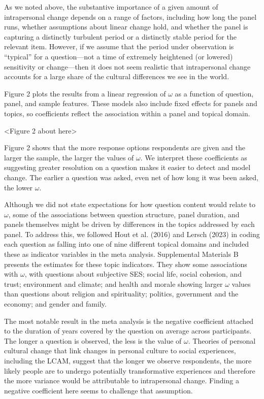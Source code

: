 \documentclass[
  11pt,
]{article}
\begin{document}
As we noted above, the substantive importance of a given amount of
intrapersonal change depends on a range of factors, including how long
the panel runs, whether assumptions about linear change hold, and
whether the panel is capturing a distinctly turbulent period or a
distinctly stable period for the relevant item. However, if we assume
that the period under observation is ``typical'' for a question---not a
time of extremely heightened (or lowered) sensitivity or change---then
it does not seem realistic that intrapersonal change accounts for a
large share of the cultural differences we see in the world.

Figure 2 plots the results from a linear regression of \(\omega\) as a
function of question, panel, and sample features. These models also
include fixed effects for panels and topics, so coefficients reflect the
association within a panel and topical domain.

\begin{center}
<Figure 2 about here>
\end{center}

Figure 2 shows that the more response options respondents are given and
the larger the sample, the larger the values of \(\omega\). We interpret
these coefficients as suggesting greater resolution on a question makes
it easier to detect and model change. The earlier a question was asked,
even net of how long it was been asked, the lower \(\omega\).

Although we did not state expectations for how question content would
relate to \(\omega\), some of the associations between question
structure, panel duration, and panels themselves might be driven by
differences in the topics addressed by each panel. To address this, we
followed Hout et al. (2016) and Lersch (2023) in coding each question as
falling into one of nine different topical domains and included these as
indicator variables in the meta analysis. Supplemental Materials B
presents the estimates for these topic indicators. They show some
associations with \(\omega\), with questions about subjective SES;
social life, social cohesion, and trust; environment and climate; and
health and morale showing larger \(\omega\) values than questions about
religion and spirituality; politics, government and the economy; and
gender and family.

The most notable result in the meta analysis is the negative coefficient
attached to the duration of years covered by the question on average
across participants. The longer a question is observed, the less is the
value of \(\omega\). Theories of personal cultural change that link
changes in personal culture to social experiences, including the LCAM,
suggest that the longer we observe respondents, the more likely people
are to undergo potentially transformative experiences and therefore the
more variance would be attributable to intrapersonal change. Finding a
negative coefficient here seems to challenge that assumption.
\end{document}
